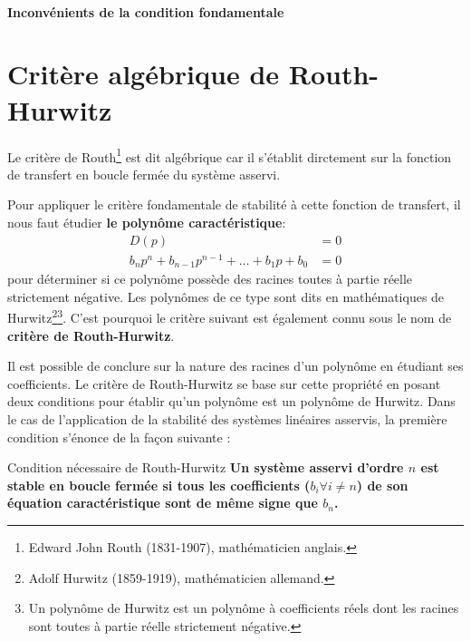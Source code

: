 \paragraph{Inconvénients de la condition fondamentale}

\section{Critère algébrique de Routh-Hurwitz
}

Le critère de Routh\footnote{Edward John Routh 
(1831-1907), mathématicien anglais.} est dit algébrique car il s'établit 
dirctement sur la fonction de transfert en boucle fermée du système asservi. 

Pour appliquer le critère fondamentale de stabilité à cette fonction de 
transfert, il nous faut étudier \textbf{le polynôme caractéristique}:
\begin{align}
    D(p)&=0 \nonumber\\
    b_np^n+b_{n-1}p^{n-1}+\ldots+b_1p+b_0 &= 0
\end{align}
pour déterminer si ce polynôme possède des racines toutes à partie réelle 
strictement négative. Les polynômes de ce type sont dits en mathématiques 
de Hurwitz\footnote{Adolf Hurwitz (1859-1919), 
mathématicien allemand.}\footnote{Un polynôme de Hurwitz est un polynôme à 
coefficients réels dont les racines sont toutes à partie réelle strictement 
négative.}.
C'est pourquoi le critère suivant est également connu sous le nom de 
\textbf{critère de Routh-Hurwitz}.

Il est possible de conclure sur la nature des racines d'un polynôme 
en étudiant ses coefficients. Le critère de Routh-Hurwitz se base sur 
cette propriété en posant deux conditions pour établir qu'un polynôme est 
un polynôme de Hurwitz. Dans le cas de l'application de la stabilité des 
systèmes linéaires asservis, la première condition s'énonce 
de la façon suivante :
\begin{criteria}{Condition nécessaire de Routh-Hurwitz }
    \textbf{Un système asservi d'ordre $n$ est stable en boucle fermée 
    si tous les coefficients ($b_i\forall i\neq n$) de son équation 
    caractéristique sont de même signe que $b_n$.}
\end{criteria}

